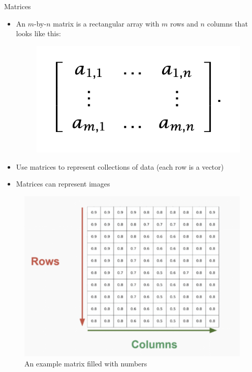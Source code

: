 \begin{frame}{Matrices}
\begin{itemize}
    \item An $m$-by-$n$ matrix is a rectangular array with $m$ rows and $n$ columns that looks like this:
    \begin{figure}
    \centering
    \includegraphics[width=.5\textwidth]{img/matrix.png}
    \end{figure}
    \item Use matrices to represent collections of data (each row is a vector)
    \item Matrices can represent images
\end{itemize}
\end{frame}

\begin{frame}
    \begin{figure}
    \centering
    \includegraphics[width=.7\textwidth]{img/num_matrix.png}
    \caption{An example matrix filled with numbers}
    \end{figure}
\end{frame}